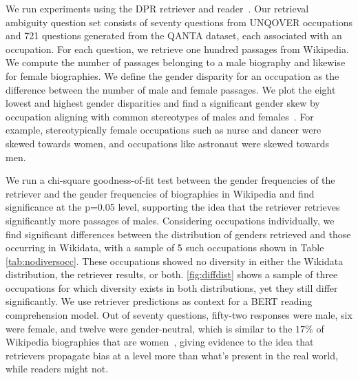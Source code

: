 We run experiments using the DPR retriever and reader~\cite{karpukhin2020dense}.
Our retrieval ambiguity question set consists of seventy questions from UNQOVER occupations and 721 questions generated from the QANTA dataset, each associated with an occupation. For each question, we retrieve one hundred passages from Wikipedia. 
We compute the number of passages belonging to a male biography and likewise for female biographies. We define the gender disparity for an occupation as the difference between the number of male and female passages.
We plot the eight lowest and highest gender disparities and find a significant gender skew by occupation aligning with common stereotypes of males and females~\cite{genderstereotype}. 
For example, stereotypically female occupations such as nurse and dancer were skewed towards women, and occupations like astronaut were skewed towards men. 

We run a chi-square goodness-of-fit test between the gender frequencies of the retriever and the gender frequencies of biographies in Wikipedia \cite{maher2018wikipedia} and find significance at the p=0.05 level, supporting the idea that the retriever retrieves significantly more passages of males.  Considering occupations individually, we find significant differences between the distribution of genders retrieved and those occurring in Wikidata, with a sample of 5 such occupations shown in Table \ref{tab:nodiversocc}.  These occupations showed no diversity in either the Wikidata distribution, the retriever results, or both.  \ref{fig:diffdist} shows a sample of three occupations for which diversity exists in both distributions, yet they still differ significantly.
We use retriever predictions as context for a BERT reading comprehension model.
Out of seventy questions, fifty-two responses were male, six were female, and twelve were gender-neutral, which is similar to the $17\%$ of Wikipedia biographies that are women~\cite{maher2018wikipedia}, giving evidence to the idea that retrievers propagate bias at a level more than what's present in the real world, while readers might not. 

